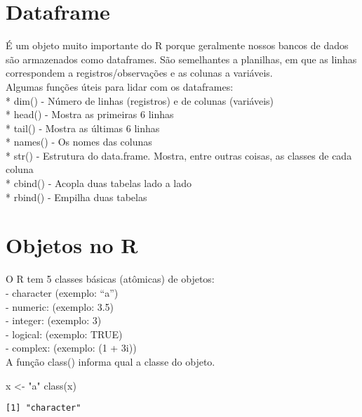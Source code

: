 \documentclass[
  letterpaper,
  DIV=11,
  numbers=noendperiod]{scrreprt}
\newenvironment{Shaded}{\begin{snugshade}}{\end{snugshade}}
\newcommand{\FunctionTok}[1]{\textcolor[rgb]{0.28,0.35,0.67}{#1}}
\newcommand{\NormalTok}[1]{\textcolor[rgb]{0.00,0.23,0.31}{#1}}
\newcommand{\OtherTok}[1]{\textcolor[rgb]{0.00,0.23,0.31}{#1}}
\newcommand{\StringTok}[1]{\textcolor[rgb]{0.13,0.47,0.30}{#1}}
\begin{document}

\chapter{Dataframe}\label{dataframe}

É um objeto muito importante do R porque geralmente nossos bancos de
dados são armazenados como dataframes. São semelhantes a planilhas, em
que as linhas correspondem a registros/observações e as colunas a
variáveis.\\
Algumas funções úteis para lidar com os dataframes:\\
* dim() - Número de linhas (registros) e de colunas (variáveis)\\
* head() - Mostra as primeiras 6 linhas\\
* tail() - Mostra as últimas 6 linhas\\
* names() - Os nomes das colunas\\
* str() - Estrutura do data.frame. Mostra, entre outras coisas, as
classes de cada coluna\\
* cbind() - Acopla duas tabelas lado a lado\\
* rbind() - Empilha duas tabelas


\chapter{Objetos no R}\label{objetos-no-r-1}

O R tem 5 classes básicas (atômicas) de objetos:\\
- character (exemplo: ``a'')\\
- numeric: (exemplo: 3.5)\\
- integer: (exemplo: 3)\\
- logical: (exemplo: TRUE)\\
- complex: (exemplo: (1 + 3i))\\
A função class() informa qual a classe do objeto.

\begin{Shaded}
\begin{Highlighting}[]
\NormalTok{x }\OtherTok{\textless{}{-}} \StringTok{"a"}  
\FunctionTok{class}\NormalTok{(x)}
\end{Highlighting}
\end{Shaded}

\begin{verbatim}
[1] "character"
\end{verbatim}
\end{document}
